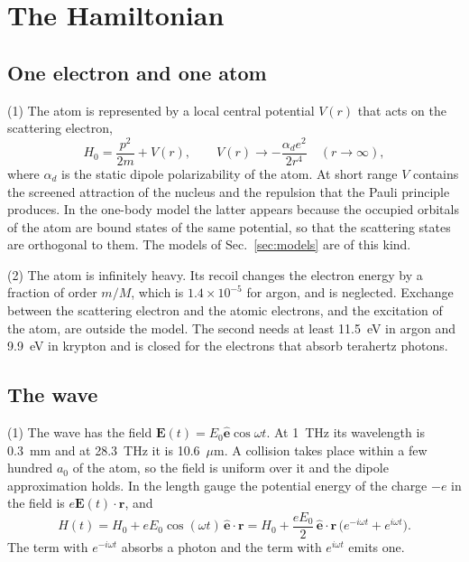 \documentclass[11pt]{article}
\numberwithin{equation}{section}
\newcommand{\ehat}{\hat{\mathbf e}}
\newcommand{\rv}{\mathbf r}
\newcommand{\Ev}{\mathbf E}
\begin{document}
\section{The Hamiltonian}
\label{sec:ham}

\subsection{One electron and one atom}
{\noindent}(1) The atom is represented by a local central potential $V(r)$
that acts on the scattering electron,
\begin{equation}
H_0=\frac{p^2}{2m}+V(r),\qquad
V(r)\to-\frac{\alpha_de^2}{2r^4}\quad(r\to\infty),
\label{eq:H0}
\end{equation}
where $\alpha_d$ is the static dipole polarizability of the atom. At short
range $V$ contains the screened attraction of the nucleus and the repulsion
that the Pauli principle produces. In the one-body model the latter appears
because the occupied orbitals of the atom are bound states of the same
potential, so that the scattering states are orthogonal to them. The models
of Sec.~\ref{sec:models} are of this kind.

{\noindent}(2) The atom is infinitely heavy. Its recoil changes the electron
energy by a fraction of order $m/M$, which is $1.4\times10^{-5}$ for argon,
and is neglected. Exchange between the scattering electron and the atomic
electrons, and the excitation of the atom, are outside the model. The second
needs at least 11.5~eV in argon and 9.9~eV in krypton and is closed for the
electrons that absorb terahertz photons.

\subsection{The wave}
{\noindent}(1) The wave has the field $\Ev(t)=E_0\ehat\cos\omega t$. At 1~THz
its wavelength is 0.3~mm and at 28.3~THz it is 10.6~$\mu$m. A collision takes
place within a few hundred $a_0$ of the atom, so the field is uniform over it
and the dipole approximation holds. In the length gauge the potential energy of
the charge $-e$ in the field is $e\Ev(t)\cdot\rv$, and
\begin{equation}
H(t)=H_0+eE_0\cos(\omega t)\,\ehat\cdot\rv
=H_0+\frac{eE_0}{2}\,\ehat\cdot\rv\,\big(e^{-i\omega t}+e^{i\omega t}\big).
\label{eq:H}
\end{equation}
The term with $e^{-i\omega t}$ absorbs a photon and the term with
$e^{i\omega t}$ emits one.
\end{document}
